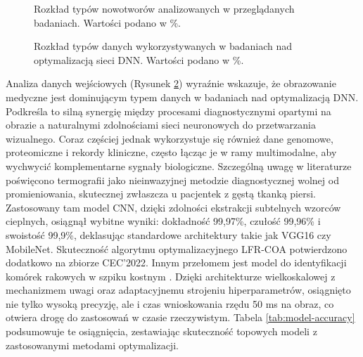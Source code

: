 \begin{figure}
    \centering
    
    \caption{Rozkład typów nowotworów analizowanych w przeglądanych badaniach. Wartości podano w \%.}
\label{fig:data-types}
\end{figure}



\begin{figure}[htbp]
    \centering
    
    \caption{Rozkład typów danych wykorzystywanych w badaniach nad optymalizacją sieci DNN. Wartości podano w \%.}
\label{fig:data-types2}
\end{figure}

Analiza danych wejściowych (Rysunek \ref{fig:data-types2}) wyraźnie wskazuje, że obrazowanie medyczne jest dominującym typem danych w badaniach nad optymalizacją DNN. Podkreśla to silną synergię między procesami diagnostycznymi opartymi na obrazie a naturalnymi zdolnościami sieci neuronowych do przetwarzania wizualnego. Coraz częściej jednak wykorzystuje się również dane genomowe, proteomiczne i rekordy kliniczne, często łącząc je w ramy multimodalne, aby wychwycić komplementarne sygnały biologiczne.
Szczególną uwagę w literaturze poświęcono termografii \cite{GG1} jako nieinwazyjnej metodzie diagnostycznej wolnej od promieniowania, skutecznej zwłaszcza u pacjentek z gęstą tkanką piersi. Zastosowany tam model CNN, dzięki zdolności ekstrakcji subtelnych wzorców cieplnych, osiągnął wybitne wyniki: dokładność 99,97\%, czułość 99,96\% i swoistość 99,9\%, deklasując standardowe architektury takie jak VGG16 czy MobileNet. Skuteczność algorytmu optymalizacyjnego LFR-COA potwierdzono dodatkowo na zbiorze CEC’2022. Innym przełomem jest model do identyfikacji komórek rakowych w szpiku kostnym \cite{AA1}. Dzięki architekturze wielkoskalowej z mechanizmem uwagi oraz adaptacyjnemu strojeniu hiperparametrów, osiągnięto nie tylko wysoką precyzję, ale i czas wnioskowania rzędu 50 ms na obraz, co otwiera drogę do zastosowań w czasie rzeczywistym. Tabela \ref{tab:model-accuracy} podsumowuje te osiągnięcia, zestawiając skuteczność topowych modeli z zastosowanymi metodami optymalizacji.

